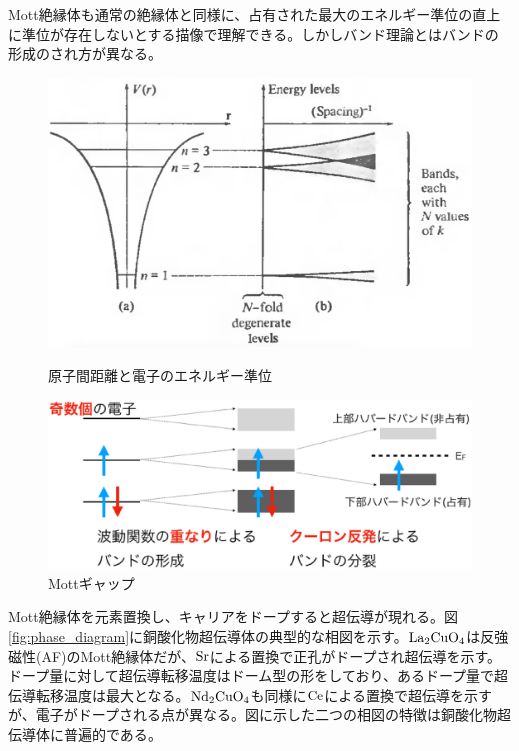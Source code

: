 Mott絶縁体も通常の絶縁体と同様に、占有された最大のエネルギー準位の直上に準位が存在しないとする描像で理解できる。しかしバンド理論とはバンドの形成のされ方が異なる。

\begin{figure}[!h]
 \begin{minipage}{0.5\hsize}
    \begin{center}
   \includegraphics[width=\hsize]{Introduction/band.eps}
  \end{center}
  \caption{原子間距離と電子のエネルギー準位\cite{ashcroft1976}}
  \label{fig:band}
 \end{minipage}
 \begin{minipage}{0.5\hsize}
    \begin{center}
   \includegraphics[width=\hsize]{Introduction/Mott_gap.eps}
  \end{center}
  \caption{Mottギャップ}
  \label{fig:Mott_gap}
 \end{minipage}
\end{figure}

Mott絶縁体を元素置換し、キャリアをドープすると超伝導が現れる。図\ref{fig:phase_diagram}に銅酸化物超伝導体の典型的な相図を示す\cite{Andrea2003}。$\rm La_2CuO_4$は反強磁性(AF)のMott絶縁体だが、$\rm Sr$による置換で正孔がドープされ超伝導を示す。ドープ量に対して超伝導転移温度はドーム型の形をしており、あるドープ量で超伝導転移温度は最大となる。$\rm Nd_2CuO_4$も同様に$\rm Ce$による置換で超伝導を示すが、電子がドープされる点が異なる。図に示した二つの相図の特徴は銅酸化物超伝導体に普遍的である\cite{Lee2006}。

